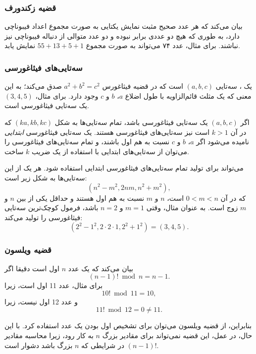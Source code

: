 \subsubsection{قضیه زکندورف}


بیان می‌کند که هر
عدد صحیح مثبت نمایش یکتایی
به صورت مجموع اعداد فیبوناچی دارد، به طوری که
هیچ دو عددی برابر نبوده و دو عدد متوالی از
دنباله فیبوناچی نیز نباشند.
برای مثال، عدد ۷۴ می‌تواند به صورت
مجموع $55+13+5+1$ نمایش یابد.

\subsubsection{سه‌تایی‌های فیثاغورسی}


یک ، سه‌تایی $(a,b,c)$ است
که در قضیه فیثاغورس $a^2+b^2=c^2$ صدق می‌کند؛
به این معنی که یک مثلث قائم‌الزاویه
با طول اضلاع $a$، $b$ و $c$ وجود دارد.
برای مثال، $(3,4,5)$ یک سه‌تایی فیثاغورسی است.

اگر $(a,b,c)$ یک سه‌تایی فیثاغورسی باشد،
تمام سه‌تایی‌ها به شکل $(ka,kb,kc)$
که در آن $k>1$ است نیز سه‌تایی‌های فیثاغورسی هستند.
یک سه‌تایی فیثاغورسی \emph{ابتدایی} نامیده می‌شود اگر
$a$، $b$ و $c$ نسبت به هم اول باشند،
و تمام سه‌تایی‌های فیثاغورسی را می‌توان
از سه‌تایی‌های ابتدایی با استفاده از یک ضریب $k$ ساخت.

 می‌تواند برای تولید تمام سه‌تایی‌های فیثاغورسی ابتدایی استفاده شود.
هر یک از این سه‌تایی‌ها به شکل زیر است:
\[(n^2-m^2,2nm,n^2+m^2),\]
که در آن $0<m<n$ است، $n$ و $m$ نسبت به هم اول هستند
و حداقل یکی از بین $n$ و $m$ زوج است.
به عنوان مثال، وقتی $m=1$ و $n=2$ باشد، فرمول
کوچک‌ترین سه‌تایی فیثاغورسی را تولید می‌کند:
\[(2^2-1^2,2\cdot2\cdot1,2^2+1^2)=(3,4,5).\]

\subsubsection{قضیه ویلسون}


بیان می‌کند که یک عدد $n$
اول است دقیقا اگر
\[(n-1)! \bmod n = n-1.\]
برای مثال، عدد 11 اول است، زیرا
\[10! \bmod 11 = 10,\]
و عدد 12 اول نیست، زیرا
\[11! \bmod 12 = 0 \neq 11.\]

بنابراین، از قضیه ویلسون می‌توان برای تشخیص
اول بودن یک عدد استفاده کرد. با این حال، در عمل، این قضیه نمی‌تواند
برای مقادیر بزرگ $n$ به کار رود، زیرا محاسبه
مقادیر $(n-1)!$ در شرایطی که $n$ بزرگ باشد دشوار است.